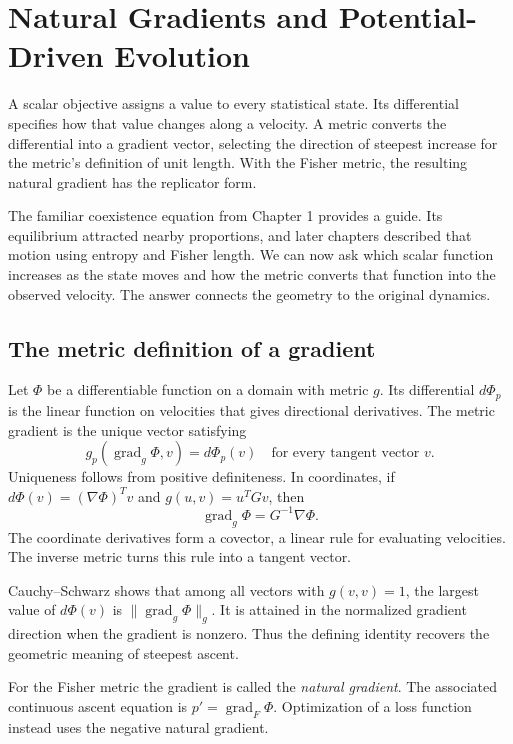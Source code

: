 \documentclass[11pt,oneside,openany]{book}
\theoremstyle{definition}
\theoremstyle{remark}
\newcommand{\grad}{\operatorname{grad}}
\numberwithin{equation}{chapter}
\begin{document}
\mainmatter
\setcounter{chapter}{8}
\chapter{Natural Gradients and Potential-Driven Evolution}
\label{ch:natural}

A scalar objective assigns a value to every statistical state. Its differential specifies how that value changes along a velocity. A metric converts the differential into a gradient vector, selecting the direction of steepest increase for the metric's definition of unit length. With the Fisher metric, the resulting natural gradient has the replicator form.

The familiar coexistence equation from Chapter 1 provides a guide. Its equilibrium attracted nearby proportions, and later chapters described that motion using entropy and Fisher length. We can now ask which scalar function increases as the state moves and how the metric converts that function into the observed velocity. The answer connects the geometry to the original dynamics.

\section{The metric definition of a gradient}
Let $\Phi$ be a differentiable function on a domain with metric $g$. Its differential $d\Phi_p$ is the linear function on velocities that gives directional derivatives. The metric gradient is the unique vector satisfying
\begin{equation}\label{eq:gradientdefinition}
g_p(\grad_g\Phi,v)=d\Phi_p(v)
\quad\text{for every tangent vector }v.
\end{equation}
Uniqueness follows from positive definiteness. In coordinates, if $d\Phi(v)=(\nabla\Phi)^Tv$ and $g(u,v)=u^TGv$, then
\begin{equation}\label{eq:metricgradient}
\grad_g\Phi=G^{-1}\nabla\Phi.
\end{equation}
The coordinate derivatives form a covector, a linear rule for evaluating velocities. The inverse metric turns this rule into a tangent vector.

Cauchy--Schwarz shows that among all vectors with $g(v,v)=1$, the largest value of $d\Phi(v)$ is $\|\grad_g\Phi\|_g$. It is attained in the normalized gradient direction when the gradient is nonzero. Thus the defining identity recovers the geometric meaning of steepest ascent.

For the Fisher metric the gradient is called the \emph{natural gradient}. The associated continuous ascent equation is $p'=\grad_F\Phi$. Optimization of a loss function instead uses the negative natural gradient.
\end{document}
